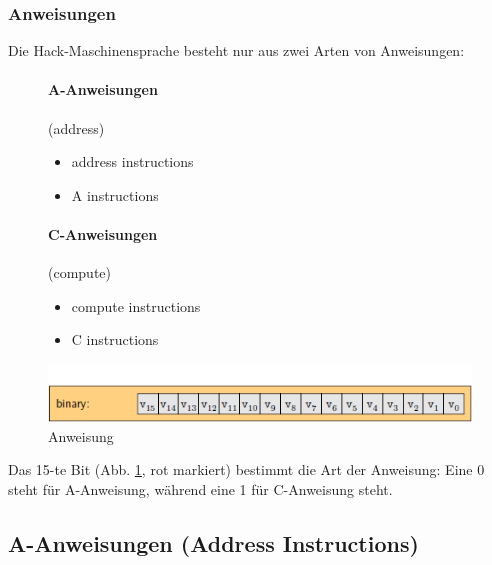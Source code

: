\documentclass[12pt]{report}
\begin{document}
\subsubsection{Anweisungen}
Die Hack-Maschinensprache besteht nur aus zwei Arten von Anweisungen:
\begin{figure}[H]
  \begin{minipage}[t]{0.45\textwidth}
    \paragraph{A-Anweisungen} (address)
    \begin{itemize}
      \item address instructions
      \item A instructions
    \end{itemize}
  \end{minipage}
  \hfill
  \begin{minipage}[t]{0.45\textwidth}
    \paragraph{C-Anweisungen} (compute)
    \begin{itemize}
      \item compute instructions
      \item C instructions
    \end{itemize}
  \end{minipage}
\end{figure}

\begin{figure}[H]
  \caption{Anweisung}
  \label{fig:maschinensprache_anweisung}
  \centering
  \includegraphics{maschinensprache_anweisung}
\end{figure}

Das 15-te Bit (Abb. \ref{fig:maschinensprache_anweisung}, rot markiert) bestimmt die Art der Anweisung:
Eine 0 steht für A-Anweisung, während eine 1 für C-Anweisung steht.



\subsection{A-Anweisungen (Address Instructions)}
\end{document}
